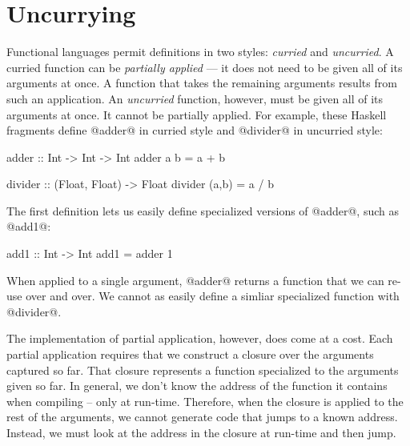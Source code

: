 \documentclass[12pt]{report}
\begin{document}

\chapter{Uncurrying}
\label{ref_chapter_uncurrying}

Functional languages permit definitions in two styles: \emph{curried}
and \emph{uncurried}. A curried function can be \emph{partially
  applied} --- it does not need to be given all of its arguments at
once. A function that takes the remaining arguments results from such
an application. An \emph{uncurried} function, however, must be given
all of its arguments at once. It cannot be partially applied. For
example, these Haskell fragments define @adder@ in curried style and
@divider@ in uncurried style:

\begin{code}
adder :: Int -> Int -> Int
adder a b = a + b

divider :: (Float, Float) -> Float
divider (a,b) = a / b
\end{code}

\noindent
The first definition lets us easily define specialized versions of @adder@, 
such as @add1@:

\begin{code}
add1 :: Int -> Int
add1 = adder 1
\end{code}

When applied to a single argument, @adder@ returns a function that we can re-use over and over. We cannot as easily define a simliar specialized function with @divider@.

The implementation of partial application, however, does come at a
cost. Each partial application requires that we construct a closure
over the arguments captured so far. That closure represents a function specialized
to the arguments given so far. In general, we don't know the address of the function
it contains when compiling -- only at run-time. Therefore, when the closure is
applied to the rest of the arguments, we cannot generate code that jumps to a
known address. Instead, we must look at the address in the closure at run-time and 
then jump. 
\end{document}
